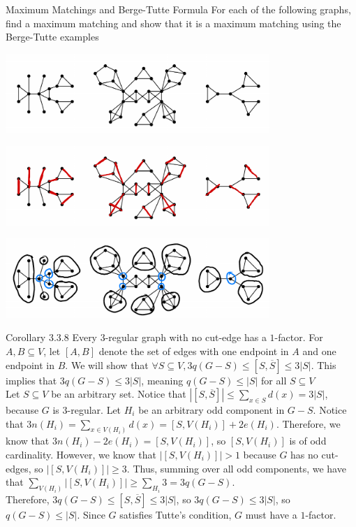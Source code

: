 \documentclass[10pt]{extarticle}
\begin{document}
  \begin{problem}{Maximum Matchings and Berge-Tutte Formula}
    For each of the following graphs, find a maximum matching and show that it is a maximum matching using the Berge-Tutte examples
    \begin{center}
      \includegraphics[width=10cm]{berge_tutte_blank}
    \end{center}
    \begin{center}
      \includegraphics[width=10cm]{berge_tutte_matchings}
    \end{center}
    \begin{center}
      \includegraphics[width=10cm]{berge_tutte_sets}
    \end{center}
  \end{problem}
  \begin{problem}{Corollary 3.3.8}
    Every $3$-regular graph with no cut-edge has a $1$-factor.
    \tcblower
    For $A,B\subseteq V$, let $[A,B]$ denote the set of edges with one endpoint in $A$ and one endpoint in $B$. We will show that $\forall S\subseteq V, 3q(G-S) \leq [S,\overline{S}] \leq 3|S|$. This implies that $3q(G-S) \leq 3|S|$, meaning $q(G-S) \leq |S|$ for all $S\subseteq V$\\

    Let $S\subseteq V$ be an arbitrary set. Notice that $|[S,\overline{S}]| \leq \sum_{x\in S}d(x) = 3|S|$, because $G$ is $3$-regular. Let $H_i$ be an arbitrary odd component in $G-S$. Notice that $3n(H_i) = \sum_{x\in V(H_i)}d(x) = [S,V(H_i)] + 2e(H_i)$. Therefore, we know that $3n(H_i) - 2e(H_i) = [S,V(H_i)]$, so $[S,V(H_i)]$ is of odd cardinality. However, we know that $|[S,V(H_i)]| > 1$ because $G$ has no cut-edges, so $|[S,V(H_i)]| \geq 3$. Thus, summing over all odd components, we have that $\sum_{V(H_i)} |[S,V(H_i)]| \geq \sum_{H_i} 3 = 3q(G-S)$.\\

    Therefore, $3q(G-S) \leq [S,\overline{S}] \leq 3|S|$, so $3q(G-S) \leq 3|S|$, so $q(G-S) \leq |S|$. Since $G$ satisfies Tutte's condition, $G$ must have a $1$-factor.
  \end{problem}
\end{document}
